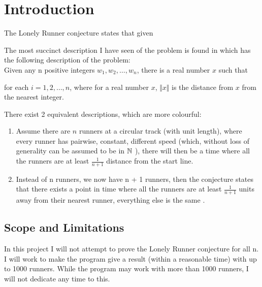 \section{Introduction}
\label{introduction}

The Lonely Runner conjecture states that given 

The most succinct description I have seen of the problem is found in \cite{ANote} which has the following description of the problem:\\

Given any n positive integers $w_1, w_2, \ldots, w_n$, there is a real number $x$ such that 

for each $i = 1, 2, \ldots, n$, where for a real number $x$, $\Vert x \Vert$ is the distance from $x$ from the nearest integer.

There exist 2 equivalent descriptions, which are more colourful:
\begin{enumerate}
\item Assume there are $n$ runners at a circular track (with unit length), where every runner has pairwise, constant, different speed (which, without loss of generality can be assumed to be in $\mathbb{N}$ \cite{Bienia97flows.view-obstructions} ), there will then be a time where all the runners are at least $\frac{1}{n + 1}$ distance from the start line.\\

\item Instead of n runners, we now have n + 1 runners, then the conjecture states that there exists a point in time where all the runners are at least $\frac{1}{n + 1}$ units away from their nearest runner, everything else is the same \cite{Bienia97flows.view-obstructions}.\\
\end{enumerate}

\subsection{Scope and Limitations}
\label{scope}
In this project I will not attempt to prove the Lonely Runner conjecture for all n. 
I will work to make the program give a result (within a reasonable time) with up to 1000 runners. While the program may work with more than 1000 runners, I will not dedicate any time to this.

